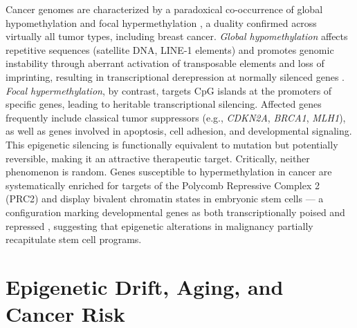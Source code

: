 Cancer genomes are characterized by a paradoxical co-occurrence of global
hypomethylation and focal hypermethylation \cite{ehrlich2002}, a duality
confirmed across virtually all tumor types, including breast cancer.
\emph{Global hypomethylation} affects repetitive sequences (satellite DNA,
LINE-1 elements) and promotes genomic instability through aberrant activation
of transposable elements and loss of imprinting, resulting in transcriptional
derepression at normally silenced genes \cite{ehrlich2002}.
\emph{Focal hypermethylation}, by contrast, targets CpG islands at the promoters
of specific genes, leading to heritable transcriptional silencing. Affected genes
frequently include classical tumor suppressors (e.g., \textit{CDKN2A},
\textit{BRCA1}, \textit{MLH1}), as well as genes involved in apoptosis, cell
adhesion, and developmental signaling. This epigenetic silencing is functionally
equivalent to mutation but potentially reversible, making it an attractive
therapeutic target.
Critically, neither phenomenon is random. Genes susceptible to hypermethylation
in cancer are systematically enriched for targets of the Polycomb Repressive
Complex 2 (PRC2) and display bivalent chromatin states in embryonic stem cells ---
a configuration marking developmental genes as both transcriptionally poised and
repressed \cite{Teschendorff2010_stemcell}, suggesting that epigenetic alterations
in malignancy partially recapitulate stem cell programs.
\section{Epigenetic Drift, Aging, and Cancer Risk}

